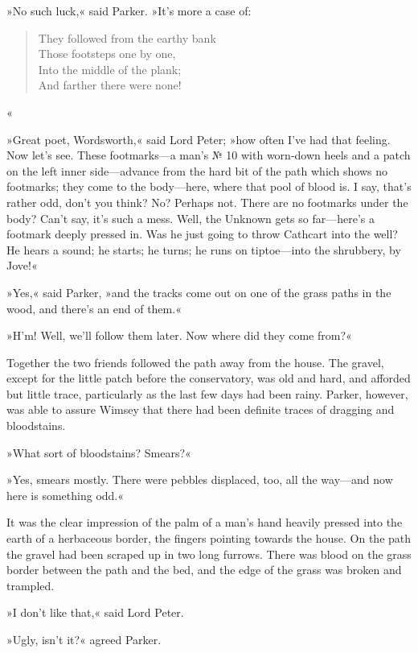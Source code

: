 »No such luck,« said Parker. »It's more a case of:
\begin{verse}
They followed from the earthy bank\\
Those footsteps one by one,\\
Into the middle of the plank;\\
And farther there were none!\end{verse}«

»Great poet, Wordsworth,« said Lord Peter; »how often I've had that feeling. Now let's see. These footmarks\allowbreak---\allowbreak a man's № 10 with worn-down heels and a patch on the left inner side\allowbreak---\allowbreak advance from the hard bit of the path which shows no footmarks; they come to the body\allowbreak---\allowbreak here, where that pool of blood is. I say, that's rather odd, don't you think? No? Perhaps not. There are no footmarks under the body? Can't say, it's such a mess. Well, the Unknown gets so far\allowbreak---\allowbreak here's a footmark deeply pressed in. Was he just going to throw Cathcart into the well? He hears a sound; he starts; he turns; he runs on tiptoe\allowbreak---\allowbreak into the shrubbery, by Jove!«

»Yes,« said Parker, »and the tracks come out on one of the grass paths in the wood, and there's an end of them.«

»H'm! Well, we'll follow them later. Now where did they come from?«

Together the two friends followed the path away from the house. The gravel, except for the little patch before the conservatory, was old and hard, and afforded but little trace, particularly as the last few days had been rainy. Parker, however, was able to assure Wimsey that there had been definite traces of dragging and bloodstains.

»What sort of bloodstains? Smears?«

»Yes, smears mostly. There were pebbles displaced, too, all the way\allowbreak---\allowbreak and now here is something odd.«

It was the clear impression of the palm of a man's hand heavily pressed into the earth of a herbaceous border, the fingers pointing towards the house. On the path the gravel had been scraped up in two long furrows. There was blood on the grass border between the path and the bed, and the edge of the grass was broken and trampled.

»I don't like that,« said Lord Peter.

»Ugly, isn't it?« agreed Parker.

